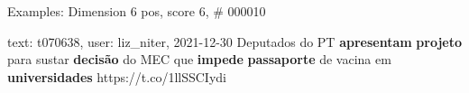 \begin{frame}{Examples: Dimension 6 pos, score 6, \# 000010}
\footnotesize
\begin{exampleblock}{text: t070638, user: liz\_niter, 2021-12-30}
Deputados do PT \textbf{apresentam} \textbf{projeto} para sustar 
\textbf{decisão} do MEC que \textbf{impede} \textbf{passaporte} de vacina em 
\textbf{universidades} https://t.co/1llSSCIydi 
\end{exampleblock}
\end{frame}
